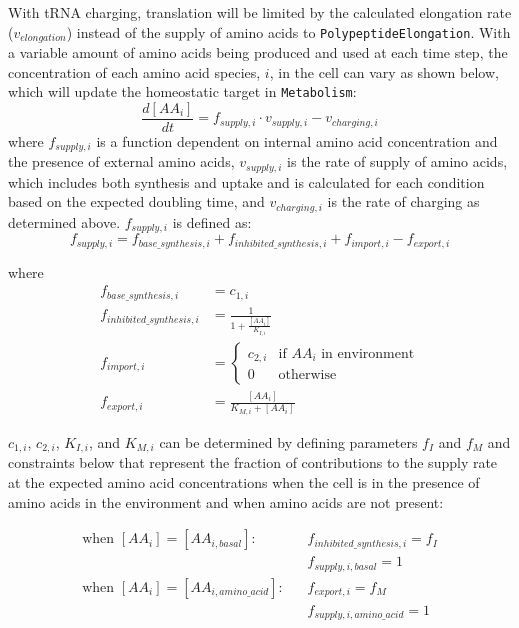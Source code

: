 \documentclass[12pt]{article}
\begin{document}
With tRNA charging, translation will be limited by the calculated elongation rate ($v_{elongation}$) instead of the supply of amino acids to \texttt{PolypeptideElongation}.  With a variable amount of amino acids being produced and used at each time step, the concentration of each amino acid species, $i$, in the cell can vary as shown below, which will update the homeostatic target in \texttt{Metabolism}:
\begin{equation}
\frac{d[AA_i]}{dt} = f_{supply,i}\cdot v_{supply,i} - v_{charging,i}
\end{equation}
where $f_{supply,i}$ is a function dependent on internal amino acid concentration and the presence of external amino acids, $v_{supply,i}$ is the rate of supply of amino acids, which includes both synthesis and uptake and is calculated for each condition based on the expected doubling time, and $v_{charging,i}$ is the rate of charging as determined above.  $f_{supply,i}$ is defined as:
\begin{equation}
f_{supply,i} = f_{base\_synthesis,i} + f_{inhibited\_synthesis,i} + f_{import,i} - f_{export,i}
\end{equation}

where
\begin{align}
    f_{base\_synthesis,i} &= c_{1,i} \\
    f_{inhibited\_synthesis,i} &= \frac{1}{1 + \frac{[AA_i]}{K_{I,i}}} \\
    f_{import,i} &=
    \begin{cases}
        c_{2,i} & \text{if $AA_i$ in environment} \\
        0 & \text{otherwise}
    \end{cases} \\
    f_{export,i} &= \frac{[AA_i]}{K_{M,i} + [AA_i]}
\end{align}

$c_{1,i}$, $c_{2,i}$, $K_{I,i}$, and $K_{M,i}$ can be determined by defining parameters $f_I$ and $f_M$ and constraints below that represent the fraction of contributions to the supply rate at the expected amino acid concentrations when the cell is in the presence of amino acids in the environment and when amino acids are not present:

\begin{align}
    \text{when $[AA_i] = [AA_{i,basal}]$}: \hspace{10pt} & f_{inhibited\_synthesis,i} = f_I \\
    & f_{supply,i,basal} = 1 \\
    \text{when $[AA_i] = [AA_{i,amino\_acid}]$}:\hspace{10pt} & f_{export,i} = f_M \\
    & f_{supply,i,amino\_acid} = 1
\end{align}
\end{document}
